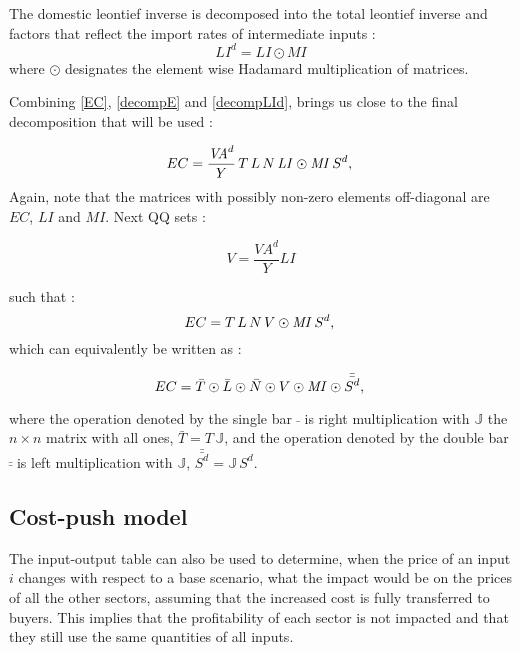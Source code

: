 \documentclass[12pt,english]{article}
\newcommand{\mli}[1]{\mathit{#1}}
\begin{document}
The domestic leontief inverse is decomposed into the total leontief inverse and factors that reflect the import rates of intermediate inputs : 
\begin{equation}
	LI^d = \mli{LI} \odot \mli{MI} \label{decompLId}
\end{equation}
where $\odot$ designates the element wise Hadamard multiplication of matrices.

Combining \ref{EC}, \ref{decompE} and \ref{decompLId}, brings us close to the final decomposition that will be used :

\begin{equation}
EC	= \frac{\mli{VA}^d}{Y} \, T \, L \, N \, \mli{LI} \odot \mli{MI} \, S^d,   \label{decompEC1} \\ 
\end{equation}
Again, note that the matrices with possibly non-zero elements off-diagonal are $EC$, $LI$ and $MI$. Next QQ sets :

$$ V = \frac{\mli{VA}^d}{Y} \mli{LI}$$ 

such that :
\begin{equation}
EC	= T \, L \, N \, V \odot \mli{MI} \, S^d,   \label{decompEC1} \\ 
\end{equation}
which can equivalently be written as :

\begin{equation}
EC	= \bar{T} \odot \bar{L} \odot \bar{N} \odot V \odot \mli{MI} \odot \bar{\bar{S^d}},   \label{decompEC2} \\ 
\end{equation}

where the operation denoted by the single bar $\bar{\ }$ is right multiplication with $\mathbb{J}$ the $n\times n$ matrix with all ones, $\bar{T} = T \, \mathbb{J}$, and the operation denoted by the double bar $\bar{\bar{\ }}$ is left multiplication with $\mathbb{J}$, $\bar{\bar{S^d}} = \mathbb{J} \, S^d$. 

\subsection{Cost-push model}

The input-output table can also be used to determine, when the price of an input $i$ changes with respect to a base scenario, what the impact would be on the prices of all the other sectors, assuming that the increased cost is fully transferred to buyers. This implies that the profitability of each sector is not impacted and that they still use the same quantities of all inputs. 
\end{document}
